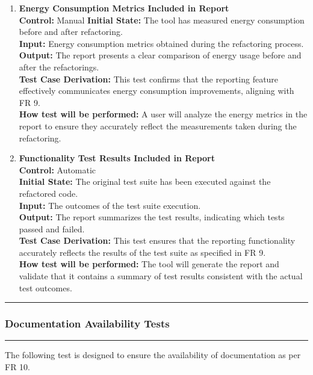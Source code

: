 \documentclass[12pt, titlepage]{article}
\newcommand{\colorrule}{\textcolor{BlueViolet}{\rule{\linewidth}{2pt}}}
\begin{document}
\begin{enumerate}[label={\bf
    \textcolor{Maroon}{test-FR-RP-\arabic*}}, wide=0pt, font=\itshape]
  \item \textbf{Energy Consumption Metrics Included in Report}\\[2mm]
    \textbf{Control:} Manual
    \textbf{Initial State:} The tool has measured energy consumption
    before and after refactoring.\\
    \textbf{Input:} Energy consumption metrics obtained during the
    refactoring process.\\
    \textbf{Output:} The report presents a clear comparison of energy
    usage before and after the refactorings.\\[2mm]
    \textbf{Test Case Derivation:} This test confirms that the
    reporting feature effectively communicates energy consumption
    improvements, aligning with FR 9.\\[2mm]
    \textbf{How test will be performed:} A user will analyze the
    energy metrics in the report to ensure they accurately reflect
    the measurements taken during the refactoring.

  \item \textbf{Functionality Test Results Included in Report}\\[2mm]
    \textbf{Control:} Automatic \\
    \textbf{Initial State:} The original test suite has been executed
    against the refactored code.\\
    \textbf{Input:} The outcomes of the test suite execution.\\
    \textbf{Output:} The report summarizes the test results,
    indicating which tests passed and failed.\\[2mm]
    \textbf{Test Case Derivation:} This test ensures that the
    reporting functionality accurately reflects the results of the
    test suite as specified in FR 9.\\[2mm]
    \textbf{How test will be performed:} The tool will generate the
    report and validate that it contains a summary of test results
    consistent with the actual test outcomes.
\end{enumerate}

\noindent
\colorrule

\subsubsection{Documentation Availability Tests}
\colorrule

\medskip

\noindent
The following test is designed to ensure the availability of
documentation as per FR 10.
\end{document}
